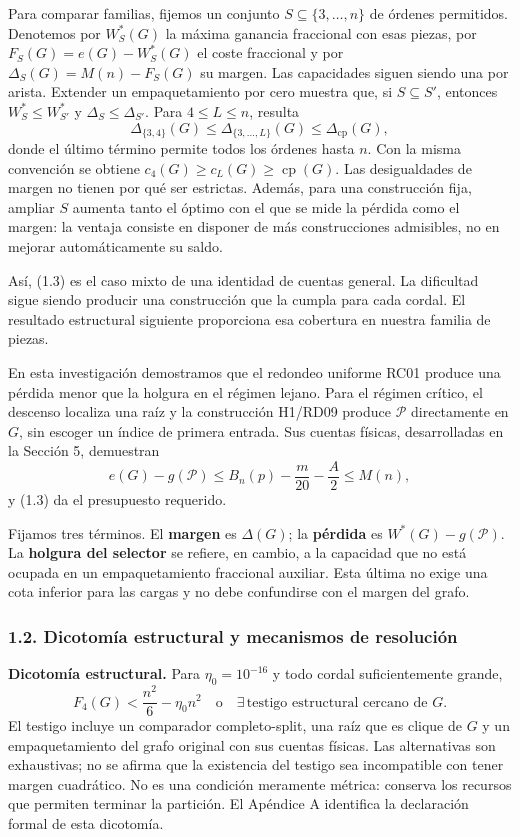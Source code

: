 \documentclass[spanish,11pt,a4paper]{article}
\begin{document}
Para comparar familias, fijemos un conjunto \(S\subseteq\{3,\ldots,n\}\) de órdenes permitidos. Denotemos por \(W_S^*(G)\) la máxima ganancia fraccional con esas piezas, por \(F_S(G)=e(G)-W_S^*(G)\) el coste fraccional y por \(\Delta_S(G)=M(n)-F_S(G)\) su margen. Las capacidades siguen siendo una por arista. Extender un empaquetamiento por cero muestra que, si \(S\subseteq S'\), entonces \(W_S^*\le W_{S'}^*\) y \(\Delta_S\le\Delta_{S'}\). Para \(4\le L\le n\), resulta \[
\Delta_{\{3,4\}}(G)\le\Delta_{\{3,\ldots,L\}}(G)
\le\Delta_{\mathrm{cp}}(G),
\tag{1.3b}
\] donde el último término permite todos los órdenes hasta \(n\). Con la misma convención se obtiene \(c_4(G)\ge c_L(G)\ge\operatorname{cp}(G)\). Las desigualdades de margen no tienen por qué ser estrictas. Además, para una construcción fija, ampliar \(S\) aumenta tanto el óptimo con el que se mide la pérdida como el margen: la ventaja consiste en disponer de más construcciones admisibles, no en mejorar automáticamente su saldo.

Así, (1.3) es el caso mixto de una identidad de cuentas general. La dificultad sigue siendo producir una construcción que la cumpla para cada cordal. El resultado estructural siguiente proporciona esa cobertura en nuestra familia de piezas.

En esta investigación demostramos que el redondeo uniforme RC01 produce una pérdida menor que la holgura en el régimen lejano. Para el régimen crítico, el descenso localiza una raíz y la construcción H1/RD09 produce \(\mathcal P\) directamente en \(G\), sin escoger un índice de primera entrada. Sus cuentas físicas, desarrolladas en la Sección 5, demuestran \[
e(G)-g(\mathcal P)
\le B_n(p)-\frac m{20}-\frac A2
\le M(n),
\tag{1.4}
\] y (1.3) da el presupuesto requerido.

Fijamos tres términos. El \textbf{margen} es \(\Delta(G)\); la \textbf{pérdida} es \(W^*(G)-g(\mathcal P)\). La \textbf{holgura del selector} se refiere, en cambio, a la capacidad que no está ocupada en un empaquetamiento fraccional auxiliar. Esta última no exige una cota inferior para las cargas y no debe confundirse con el margen del grafo.

\subsubsection{1.2. Dicotomía estructural y mecanismos de resolución}\label{dicotomuxeda-estructural-y-mecanismos-de-resoluciuxf3n}

\textbf{Dicotomía estructural.} Para \(\eta_0=10^{-16}\) y todo cordal suficientemente grande, \[
\boxed{
F_4(G)<\frac{n^2}{6}-\eta_0n^2
\quad\text{o}\quad
\exists\,\text{testigo estructural cercano de }G.
}
\tag{1.5}
\] El testigo incluye un comparador completo-split, una raíz que es clique de \(G\) y un empaquetamiento del grafo original con sus cuentas físicas. Las alternativas son exhaustivas; no se afirma que la existencia del testigo sea incompatible con tener margen cuadrático. No es una condición meramente métrica: conserva los recursos que permiten terminar la partición. El Apéndice A identifica la declaración formal de esta dicotomía.
\end{document}
